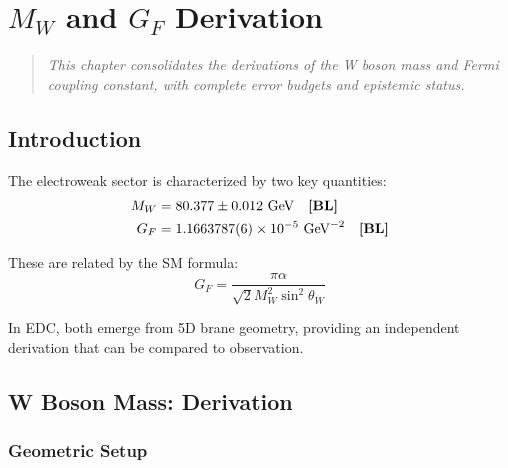 \chapter{$M_W$ and $G_F$ Derivation}
\label{ch:mw_gf}

\begin{quote}
\textit{This chapter consolidates the derivations of the W boson mass
and Fermi coupling constant, with complete error budgets and epistemic status.}
\end{quote}

\section{Introduction}
\label{sec:mw_gf_intro}

The electroweak sector is characterized by two key quantities:
\begin{align}
M_W &= 80.377 \pm 0.012 \text{ GeV} \quad \textbf{[BL]} \\
G_F &= 1.1663787(6) \times 10^{-5} \text{ GeV}^{-2} \quad \textbf{[BL]}
\end{align}

These are related by the SM formula:
\begin{equation}
G_F = \frac{\pi\alpha}{\sqrt{2}M_W^2\sin^2\theta_W}
\end{equation}

In EDC, both emerge from 5D brane geometry, providing an independent
derivation that can be compared to observation.

\section{W Boson Mass: Derivation}
\label{sec:mw_derivation}

\subsection{Geometric Setup}

